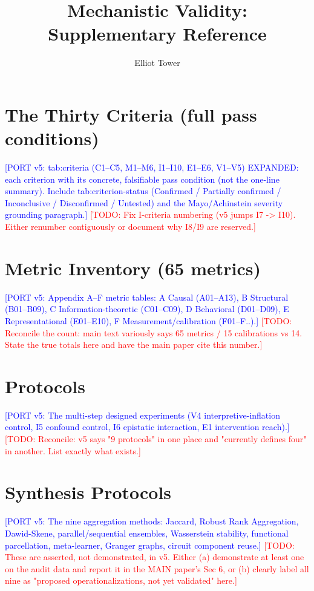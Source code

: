 \documentclass{article}
\title{Mechanistic Validity: Supplementary Reference}
\author{Elliot Tower}
\date{}
\newcommand{\TODO}[1]{\textcolor{red}{[TODO: #1]}}
\newcommand{\PORT}[1]{\textcolor{blue}{[PORT v5: #1]}}
\begin{document}
\maketitle
\tableofcontents

\section{The Thirty Criteria (full pass conditions)}
\PORT{tab:criteria (C1--C5, M1--M6, I1--I10, E1--E6, V1--V5) EXPANDED: each criterion with
its concrete, falsifiable pass condition (not the one-line summary). Include tab:criterion-status
(Confirmed / Partially confirmed / Inconclusive / Disconfirmed / Untested) and the Mayo/Achinstein
severity grounding paragraph.}
\TODO{Fix I-criteria numbering (v5 jumps I7 -> I10). Either renumber contiguously or document
why I8/I9 are reserved.}

\section{Metric Inventory (65 metrics)}
\PORT{Appendix A--F metric tables: A Causal (A01--A13), B Structural (B01--B09),
C Information-theoretic (C01--C09), D Behavioral (D01--D09), E Representational (E01--E10),
F Measurement/calibration (F01--F..).}
\TODO{Reconcile the count: main text variously says 65 metrics / 15 calibrations vs 14. State
the true totals here and have the main paper cite this number.}

\section{Protocols}
\PORT{The multi-step designed experiments (V4 interpretive-inflation control, I5 confound
control, I6 epistatic interaction, E1 intervention reach).}
\TODO{Reconcile: v5 says "9 protocols" in one place and "currently defines four" in another.
List exactly what exists.}

\section{Synthesis Protocols}
\PORT{The nine aggregation methods: Jaccard, Robust Rank Aggregation, Dawid-Skene,
parallel/sequential ensembles, Wasserstein stability, functional parcellation,
meta-learner, Granger graphs, circuit component reuse.}
\TODO{These are asserted, not demonstrated, in v5. Either (a) demonstrate at least one on the
audit data and report it in the MAIN paper's Sec 6, or (b) clearly label all nine as
"proposed operationalizations, not yet validated" here.}
\end{document}
